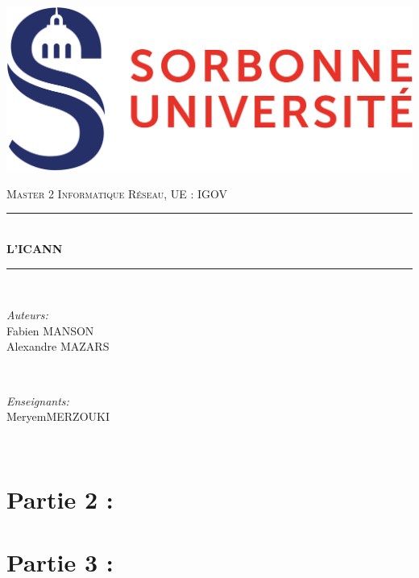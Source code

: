 \documentclass{article}
\newcommand{\UE}{IGOV}
\newcommand{\TeacherFN}{Meryem}
\newcommand{\TeacherLN}{MERZOUKI}
\begin{document}
\begin{titlepage}

\newcommand{\HRule}{\rule{\linewidth}{0.35mm}}

\includegraphics[scale=0.08]{images/logo_sorbonne.png}\\[2cm]

\center

\textsc{\huge Master 2 Informatique Réseau, UE : \UE}\\[0.8cm]

\HRule \\[0.4cm]
{ \Huge \bfseries L'ICANN}\\[0.4cm]
\HRule \\[2cm]

\begin{minipage}{0.4\textwidth}
	\begin{flushleft} \large
	\emph{Auteurs:}\\[0.2cm]
	Fabien \textsc{MANSON}\\
	Alexandre \textsc{MAZARS}
	\end{flushleft}
\end{minipage}
~
\begin{minipage}{0.4\textwidth}
	\begin{flushright} \large
	\emph{Enseignants:} \\[0.2cm]
	\TeacherFN \textsc{\TeacherLN}
	\end{flushright}
\end{minipage}\\[4cm]

\end{titlepage}


\newpage
\section{}


\newpage
\section{Partie 2 : }



\newpage
\section{Partie 3 : }



\end{document}
